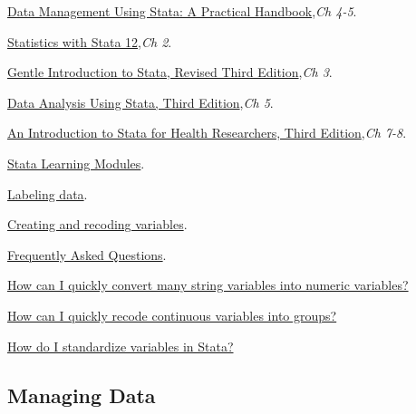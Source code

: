 \documentclass{article}
\begin{document}
\begin{compactitem}
\item \href{http://www.stata-press.com/books/data-management-using-stata/}{Data Management Using Stata: A Practical Handbook},\textit{Ch 4-5}.
\item \href{http://www.stata.com/bookstore/statistics-with-stata/}{Statistics with Stata 12},\textit{Ch 2}.
\item \href{http://statapress.com/books/gentle-introduction-to-stata/}{Gentle Introduction to Stata, Revised Third Edition},\textit{Ch 3}.
\item \href{http://statapress.com/books/data-analysis-using-stata/}{Data Analysis Using Stata, Third Edition},\textit{Ch 5}.
\item \href{http://statapress.com/books/introduction-stata-health-researchers/}{An Introduction to Stata for Health Researchers, Third Edition},\textit{Ch 7-8}.
\item \href{http://www.ats.ucla.edu/stat/stata/modules/}{Stata Learning Modules}.
\begin{compactitem}
\item \href{http://www.ats.ucla.edu/stat/stata/modules/labels.htm}{Labeling data}.
\item \href{http://www.ats.ucla.edu/stat/stata/modules/vars.htm}{Creating and recoding variables}.
\end{compactitem}


\item \href{http://www.ats.ucla.edu/stat/stata/faq/default.htm}{Frequently Asked Questions}.

\begin{compactitem}
\item \href{http://www.ats.ucla.edu/stat/stata/faq/destring.htm}{How can I quickly convert many string variables into numeric variables?}
\item \href{http://www.ats.ucla.edu/stat/stata/faq/cut.htm}{How can I quickly recode continuous variables into groups?}
\item \href{http://www.ats.ucla.edu/stat/stata/faq/standardize.htm}{How do I standardize variables in Stata?}
\end{compactitem}

\end{compactitem}

\subsection{Managing Data}
\end{document}
